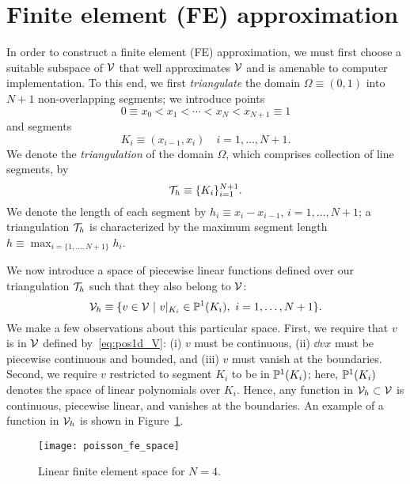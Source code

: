 \section{Finite element (FE) approximation}
In order to construct a finite element (FE) approximation, we must first choose a suitable subspace of $\mathcal{V}$ that well approximates $\mathcal{V}$ and is amenable to computer implementation. To this end, we first \emph{triangulate} the domain $\Omega \equiv (0,1)$ into $N+1$ non-overlapping segments; we introduce points
\begin{equation*}
  0 \equiv x_0 < x_1 < \cdots < x_N < x_{N+1} \equiv 1
\end{equation*}
and segments
\begin{equation*}
  K_i \equiv (x_{i-1}, x_i) \quad i = 1,\dots,N+1.
\end{equation*}
We denote the \emph{triangulation} of the domain $\Omega$, which comprises collection of line segments, by
\begin{equation}
  \mathcal{T}_h \equiv \{ K_i \}_{i=1}^{N+1}.
  \label{eq:pos1d_Th}
\end{equation}
We denote the length of each segment by $h_i \equiv x_i - x_{i-1}$, $i = 1,\dots,N+1$; a triangulation $\mathcal{T}_h$ is characterized by the maximum segment length $h \equiv \max_{i=\{ 1,\dots,N+1\}} h_i$.

We now introduce a space of piecewise linear functions defined over our triangulation $\mathcal{T}_h$ such that they also belong to $\mathcal{V}$:
\begin{equation}
  \mathcal{V}_h \equiv \{ v \in \mathcal{V} \ | \ v|_{K_i} \in \mathbb{P}^1(K_i), \ i = 1,\dots,N+1\}.
  \label{eq:pos1d_Vh}
\end{equation}
We make a few observations about this particular space.  First, we require that $v$ is in $\mathcal{V}$ defined by~\eqref{eq:pos1d_V}: (i) $v$ must be continuous, (ii) $\dd{v}{x}$ must be piecewise continuous and bounded, and (iii) $v$ must vanish at the boundaries.  Second, we require $v$ restricted to segment $K_i$ to be in $\mathbb{P}^1(K_i)$; here, $\mathbb{P}^1(K_i)$ denotes the space of linear polynomials over $K_i$.  Hence, any function in $\mathcal{V}_h \subset \mathcal{V}$ is continuous, piecewise linear, and vanishes at the boundaries. An example of a function in $\mathcal{V}_h$ is shown in Figure~\ref{fig:pos1d_fe_space}.

\begin{figure}
  \centering
  \texttt{[image: poisson\_fe\_space]}
  \caption{Linear finite element space for $N = 4$.}
  \label{fig:pos1d_fe_space}
\end{figure}

